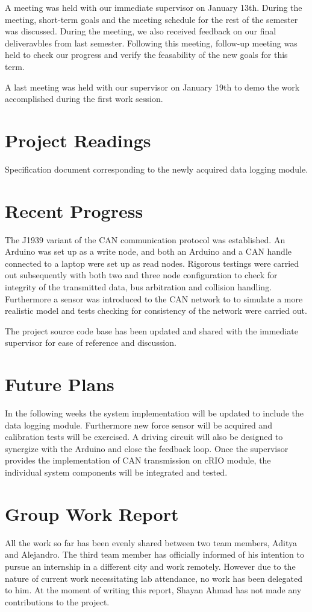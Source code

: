 \documentclass[12pt]{article}
\begin{document}
A meeting was held with our immediate supervisor on January 13th. During the
meeting, short-term goals and the meeting schedule for the rest of the semester
was discussed. During the meeting, we also received feedback on our final 
deliveravbles from last semester. Following this meeting, follow-up meeting was
held to check our progress and verify the feasability of the new goals for 
this term.\newline

A last meeting was held with our supervisor on January 19th to demo the work
accomplished during the first work session. 

\section*{Project Readings}
Specification document corresponding to the newly acquired data logging module.

\section*{Recent Progress}
The J1939 variant of the CAN communication protocol was established. An Arduino
was set up as a write node, and both an Arduino and a CAN handle connected to a
laptop were set up as read nodes. Rigorous testings were carried out 
subsequently with both two and three node configuration to check for integrity 
of the transmitted data, bus arbitration and collision handling. Furthermore a
sensor was introduced to the CAN network to to simulate a more realistic model
and tests checking for consistency of the network were carried out.\newline

The project source code base has been updated and shared with the immediate 
supervisor for ease of reference and discussion. 

\section*{Future Plans}
In the following weeks the system implementation will be updated to include 
the data logging module. Furthermore new force sensor will be acquired and 
calibration tests will be exercised. A driving circuit will also be designed
to synergize with the Arduino and close the feedback loop. Once the supervisor
provides the implementation of CAN transmission on cRIO module, the individual
system components will be integrated and tested.

\section*{Group Work Report}
All the work so far has been evenly shared between two team members, Aditya and
Alejandro. The third team member has officially informed of his intention to 
pursue an internship in a different city and work remotely. However due to the 
nature of current work necessitating lab attendance, no work has been delegated 
to him. At the moment of writing this report, Shayan Ahmad has not made any
contributions to the project.
\end{document}
